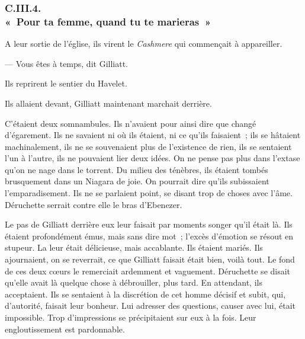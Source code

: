 \documentclass[french,twoside]{book} %
\begin{document}
 \subsubsection[{C.III.4. « Pour ta femme, quand tu te marieras »}]{C.III.4. \\
« Pour ta femme, quand tu te marieras »}
\noindent A leur sortie de l’église, ils virent le \emph{Cashmere} qui commençait à appareiller.\par
— Vous êtes à temps, dit Gilliatt.\par
Ils reprirent le sentier du Havelet.\par
Ils allaient devant, Gilliatt maintenant marchait derrière.\par
C’étaient deux somnambules. Ils n’avaient pour ainsi dire que changé d’égarement. Ils ne savaient ni où ils étaient, ni ce qu’ils faisaient ; ils se hâtaient machinalement, ils ne se souvenaient plus de l’existence de rien, ils se sentaient l’un à l’autre, ils ne pouvaient lier deux idées. On ne pense pas plus dans l’extase qu’on ne nage dans le torrent. Du milieu des ténèbres, ils étaient tombés brusquement dans un Niagara de joie. On pourrait dire qu’ils subissaient l’emparadisement. Ils ne se parlaient point, se disant trop de choses avec l’âme. Déruchette serrait contre elle le bras d’Ebenezer.\par
 Le pas de Gilliatt derrière eux leur faisait par moments songer qu’il était là. Ils étaient profondément émus, mais sans dire mot ; l’excès d’émotion se résout en stupeur. La leur était délicieuse, mais accablante. Ils étaient mariés. Ils ajournaient, on se reverrait, ce que Gilliatt faisait était bien, voilà tout. Le fond de ces deux cœurs le remerciait ardemment et vaguement. Déruchette se disait qu’elle avait là quelque chose à débrouiller, plus tard. En attendant, ils acceptaient. Ils se sentaient à la discrétion de cet homme décisif et subit, qui, d’autorité, faisait leur bonheur. Lui adresser des questions, causer avec lui, était impossible. Trop d’impressions se précipitaient sur eux à la fois. Leur engloutissement est pardonnable.\par
\end{document}
